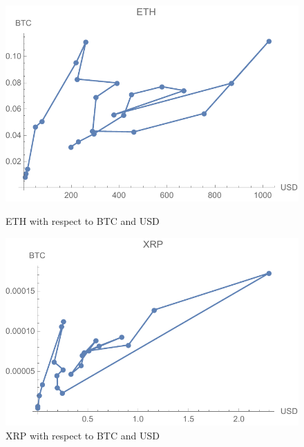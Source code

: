\begin{figure}[!htb]
	\includegraphics[width=\linewidth]{figures/eth.pdf}
	\caption{ETH with respect to BTC and USD}\label{fig:eth}
	\endminipage\hfill
	\includegraphics[width=\linewidth]{figures/xrp.pdf}
	\caption{XRP with respect to BTC and USD}\label{fig:xrp}
	\endminipage\hfill
\end{figure}


